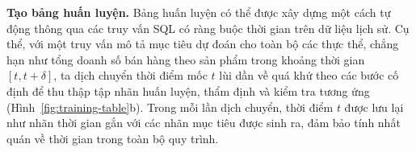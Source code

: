 \textbf{Tạo bảng huấn luyện.} Bảng huấn luyện có thể được xây dựng một cách tự động thông qua các truy vấn SQL có ràng buộc thời gian trên dữ liệu lịch sử. Cụ thể, với một truy vấn mô tả mục tiêu dự đoán cho toàn bộ các thực thể, chẳng hạn như tổng doanh số bán hàng theo sản phẩm trong khoảng thời gian $[t, t+\delta]$, ta dịch chuyển thời điểm mốc $t$ lùi dần về quá khứ theo các bước cố định để thu thập tập nhãn huấn luyện, thẩm định và kiểm tra tương ứng (Hình~\ref{fig:training-table}b). Trong mỗi lần dịch chuyển, thời điểm $t$ được lưu lại như nhãn thời gian gắn với các nhãn mục tiêu được sinh ra, đảm bảo tính nhất quán về thời gian trong toàn bộ quy trình.